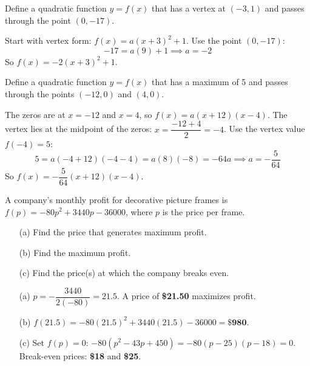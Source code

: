 \documentclass{ximera}
\begin{document}
\begin{problem}
Define a quadratic function $y = f(x)$ that has a vertex at $(-3,1)$ and passes through the point $(0,-17)$.

\begin{solution}
Start with vertex form: $f(x) = a(x+3)^2+1$. Use the point $(0,-17)$:
$$-17 = a(9)+1 \implies a = -2$$
So $f(x) = -2(x+3)^2+1$.
\end{solution}
\end{problem}


\begin{problem}
Define a quadratic function $y = f(x)$ that has a maximum of 5 and passes through the points $(-12,0)$ and $(4,0)$.

\begin{solution}
The zeros are at $x=-12$ and $x=4$, so $f(x) = a(x+12)(x-4)$. The vertex lies at the midpoint of the zeros: $x = \dfrac{-12+4}{2} = -4$. Use the vertex value $f(-4)=5$:
$$5 = a(-4+12)(-4-4) = a(8)(-8) = -64a \implies a = -\frac{5}{64}$$
So $f(x) = -\dfrac{5}{64}(x+12)(x-4)$.
\end{solution}
\end{problem}


\begin{problem}
A company's monthly profit for decorative picture frames is $f(p) = -80p^2 + 3440p - 36000$, where $p$ is the price per frame.
\begin{enumerate}
  \item[(a)] Find the price that generates maximum profit.
  \medskip
  \item[(b)] Find the maximum profit.
  \medskip
  \item[(c)] Find the price(s) at which the company breaks even.
\end{enumerate}

\begin{solution}
\begin{enumerate}
  \item[(a)] $p = -\dfrac{3440}{2(-80)} = 21.5$. A price of \textbf{\$21.50} maximizes profit.

  \item[(b)] $f(21.5) = -80(21.5)^2 + 3440(21.5) - 36000 = \mathbf{\$980}$.

  \item[(c)] Set $f(p)=0$: $-80(p^2-43p+450) = -80(p-25)(p-18) = 0$. Break-even prices: \textbf{\$18} and \textbf{\$25}.
\end{enumerate}
\end{solution}
\end{problem}
\end{document}
